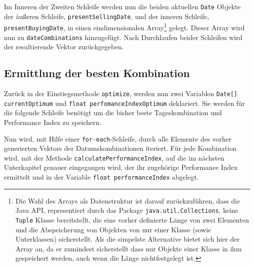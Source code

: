 \documentclass[12pt, a4paper, titlepage]{report}
\begin{document}
            Im Inneren der Zweiten Schleife werden nun die beiden aktuellen
            \texttt{Date} Objekte der äußeren Schleife, \texttt{presentSellingDate},
            und der inneren Schleife, \texttt{presentBuyingDate}, in einen eindimensionalen
            Array\footnote{Die Wahl des Arrays als Datenstruktur ist darauf zurückzuführen,
            dass die Java API, representiert durch das Package \texttt{java.util.Collections},
            keine \texttt{Tuple} Klasse bereitstellt, die eine vorher definierte Länge
            von zwei Elementen und die Abspeicherung von Objekten von nur einer Klasse
            (sowie Unterklassen) sicherstellt. Als die simpelste Alternative bietet sich
            hier der Array an, da er zumindest sicherstellt dass nur Objekte einer Klasse
            in ihm gespeichert werden, auch wenn die Länge nicht\footnotemark festgelegt ist.}
             gelegt.
            Dieser Array wird nun zu \texttt{dateCombinations} hinzugefügt.
            Nach Durchlaufen beider Schleifen wird der resultierende Vektor zurückgegeben.
            
            
            
            \subsection{Ermittlung der besten Kombination}
            Zurück in der Einstiegsmethode \texttt{optimize}, werden nun zwei Variablen
            \texttt{Date[] currentOptimum} und \texttt{float perfomanceIndexOptimum}
            deklariert. Sie werden für die folgende Schleife benötigt um die bisher
            beste Tageskombination und Performance Index zu speichern.
            
            Nun wird, mit Hilfe einer \texttt{for-each}-Schleife, durch alle Elemente
            des vorher generierten Vektors der Datumskombinationen iteriert. Für jede
            Kombination wird, mit der Methode \texttt{calculatePerformanceIndex},
            auf die im nächsten Unterkapitel genauer eingegangen wird, 
            der ihr zugehörige Performance Index ermittelt und in der Variable
            \texttt{float performanceIndex} abgelegt.
            
\end{document}
